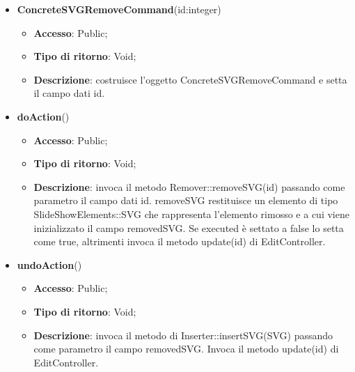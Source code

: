 {{{	
	\begin{itemize}
		\item \textbf{ConcreteSVGRemoveCommand}(id:integer)
		\begin{itemize}
			\item \textbf{Accesso}: Public;
			\item \textbf{Tipo di ritorno}: Void;
			\item \textbf{Descrizione}: costruisce l’oggetto ConcreteSVGRemoveCommand e setta il campo dati id.
		\end{itemize}
		\item \textbf{doAction}()
		\begin{itemize}
			\item \textbf{Accesso}: Public;
			\item \textbf{Tipo di ritorno}: Void;
			\item \textbf{Descrizione}: invoca il metodo Remover::removeSVG(id) passando come parametro il campo dati id.	removeSVG restituisce un elemento di tipo SlideShowElements::SVG che rappresenta l’elemento rimosso e a cui viene inizializzato il campo removedSVG. Se executed è settato a false lo setta come true, altrimenti invoca il metodo update(id) di EditController.
		\end{itemize}
		\item \textbf{undoAction}()
		\begin{itemize}
			\item \textbf{Accesso}: Public;
			\item \textbf{Tipo di ritorno}: Void;
			\item \textbf{Descrizione}: invoca il metodo di Inserter::insertSVG(SVG) passando come parametro il campo removedSVG. Invoca il metodo update(id) di EditController.
		\end{itemize}
	\end{itemize}
	}
}}
